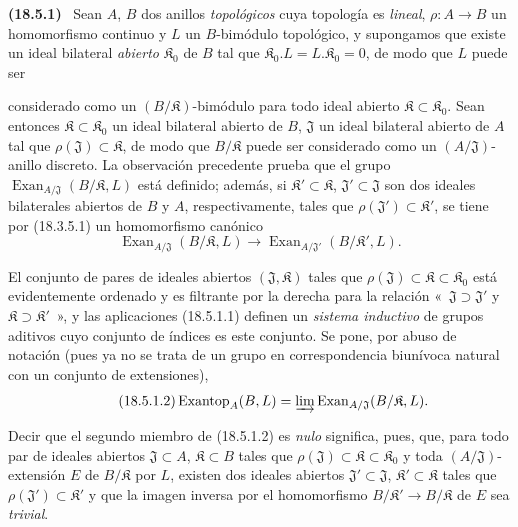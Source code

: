 \documentclass[10pt,oneside]{book}
\makeatletter
\newcommand{\setmanualcurrentlabel}[1]{\def\@currentlabel{#1}}
\newcommand{\oldpage}[2][]{%
  \setcounter{footnote}{0}%
  \marginpar{\scriptsize\textbf{#1}~|~#2}\ignorespaces}
\newenvironment{env}[1][]{\setmanualcurrentlabel{#1}\par\medskip\noindent\textbf{(#1)}\ }{\par}
\makeatother
\begin{document}
\begin{env}[18.5.1]
\label{0.18.5.1-es}
Sean $A$, $B$ dos anillos \emph{topológicos} cuya topología es \emph{lineal},
$\rho:A\to B$ un homomorfismo continuo y $L$ un $B$-bimódulo topológico, y
supongamos que existe un ideal bilateral \emph{abierto} $\mathfrak K_0$ de $B$
tal que $\mathfrak K_0.L=L.\mathfrak K_0=0$, de modo que $L$ puede ser

\oldpage[0\textsubscript{IV-1}]{67}

considerado como un $(B/\mathfrak K)$-bimódulo para todo ideal abierto
$\mathfrak K\subset\mathfrak K_0$. Sean entonces
$\mathfrak K\subset\mathfrak K_0$ un ideal bilateral abierto de $B$,
$\mathfrak J$ un ideal bilateral abierto de $A$ tal que
$\rho(\mathfrak J)\subset\mathfrak K$, de modo que $B/\mathfrak K$ puede ser
considerado como un $(A/\mathfrak J)$-anillo discreto. La observación
precedente prueba que el grupo
$\operatorname{Exan}_{A/\mathfrak J}(B/\mathfrak K,L)$ está definido; además,
si $\mathfrak K'\subset\mathfrak K$, $\mathfrak J'\subset\mathfrak J$ son dos
ideales bilaterales abiertos de $B$ y $A$, respectivamente, tales que
$\rho(\mathfrak J')\subset\mathfrak K'$, se tiene por (18.3.5.1) un
homomorfismo canónico
\begin{equation}
\label{0.18.5.1.1-es}
\tag{18.5.1.1}
  \operatorname{Exan}_{A/\mathfrak J}(B/\mathfrak K,L)
  \longrightarrow
  \operatorname{Exan}_{A/\mathfrak J'}(B/\mathfrak K',L).
\end{equation}

El conjunto de pares de ideales abiertos $(\mathfrak J,\mathfrak K)$ tales que
$\rho(\mathfrak J)\subset\mathfrak K\subset\mathfrak K_0$ está evidentemente
ordenado y es filtrante por la derecha para la relación «~$\mathfrak J\supset\mathfrak J'$
y $\mathfrak K\supset\mathfrak K'$~», y las aplicaciones (18.5.1.1)
definen un \emph{sistema inductivo} de grupos aditivos cuyo conjunto
de índices es este conjunto. Se pone, por abuso de notación (pues ya no se trata
de un grupo en correspondencia biunívoca natural con un conjunto
de extensiones),
\begin{equation}
\label{0.18.5.1.2-es}
\tag{18.5.1.2}
  \operatorname{Exantop}_A(B,L)
  =\varinjlim\operatorname{Exan}_{A/\mathfrak J}(B/\mathfrak K,L).
\end{equation}

Decir que el segundo miembro de (18.5.1.2) es \emph{nulo} significa, pues, que, para
todo par de ideales abiertos $\mathfrak J\subset A$, $\mathfrak K\subset B$
tales que $\rho(\mathfrak J)\subset\mathfrak K\subset\mathfrak K_0$ y toda
$(A/\mathfrak J)$-extensión $E$ de $B/\mathfrak K$ por $L$, existen dos
ideales abiertos $\mathfrak J'\subset\mathfrak J$,
$\mathfrak K'\subset\mathfrak K$ tales que
$\rho(\mathfrak J')\subset\mathfrak K'$ y que la imagen inversa por
el homomorfismo $B/\mathfrak K'\to B/\mathfrak K$ de $E$ sea \emph{trivial}.


\end{env}
\end{document}
